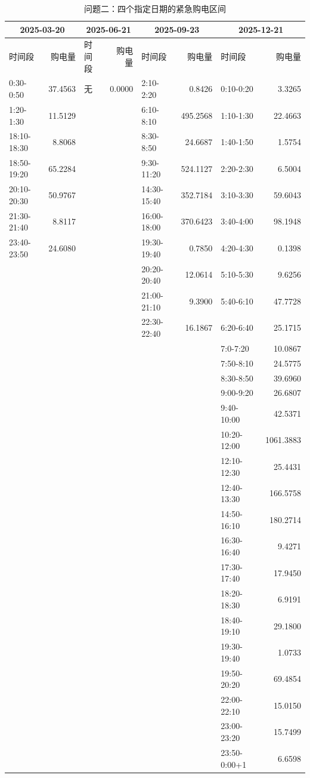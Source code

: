 \begin{table}[H]\centering\caption{问题二：四个指定日期的紧急购电区间}\label{tab:emergency-问题二}\fontsize{9}{11}\selectfont\setlength{\tabcolsep}{2pt}\begin{tabular}{|lr|lr|lr|lr|}\hline
\multicolumn{2}{|c|}{2025-03-20} & \multicolumn{2}{|c|}{2025-06-21} & \multicolumn{2}{|c|}{2025-09-23} & \multicolumn{2}{|c|}{2025-12-21}\\\hline
时间段&购电量&时间段&购电量&时间段&购电量&时间段&购电量\\\hline
0:30-0:50 & 37.4563 & 无 & 0.0000 & 2:10-2:20 & 0.8426 & 0:10-0:20 & 3.3265\\
1:20-1:30 & 11.5129 &  &  & 6:10-8:10 & 495.2568 & 1:10-1:30 & 22.4663\\
18:10-18:30 & 8.8068 &  &  & 8:30-8:50 & 24.6687 & 1:40-1:50 & 1.5754\\
18:50-19:20 & 65.2284 &  &  & 9:30-11:20 & 524.1127 & 2:20-2:30 & 6.5004\\
20:10-20:30 & 50.9767 &  &  & 14:30-15:40 & 352.7184 & 3:10-3:30 & 59.6043\\
21:30-21:40 & 8.8117 &  &  & 16:00-18:00 & 370.6423 & 3:40-4:00 & 98.1948\\
23:40-23:50 & 24.6080 &  &  & 19:30-19:40 & 0.7850 & 4:20-4:30 & 0.1398\\
 &  &  &  & 20:20-20:40 & 12.0614 & 5:10-5:30 & 9.6256\\
 &  &  &  & 21:00-21:10 & 9.3900 & 5:40-6:10 & 47.7728\\
 &  &  &  & 22:30-22:40 & 16.1867 & 6:20-6:40 & 25.1715\\
 &  &  &  &  &  & 7:0-7:20 & 10.0867\\
 &  &  &  &  &  & 7:50-8:10 & 24.5775\\
 &  &  &  &  &  & 8:30-8:50 & 39.6960\\
 &  &  &  &  &  & 9:00-9:20 & 26.6807\\
 &  &  &  &  &  & 9:40-10:00 & 42.5371\\
 &  &  &  &  &  & 10:20-12:00 & 1061.3883\\
 &  &  &  &  &  & 12:10-12:30 & 25.4431\\
 &  &  &  &  &  & 12:40-13:30 & 166.5758\\
 &  &  &  &  &  & 14:50-16:10 & 180.2714\\
 &  &  &  &  &  & 16:30-16:40 & 9.4271\\
 &  &  &  &  &  & 17:30-17:40 & 17.9450\\
 &  &  &  &  &  & 18:20-18:30 & 6.9191\\
 &  &  &  &  &  & 18:40-19:10 & 29.1800\\
 &  &  &  &  &  & 19:30-19:40 & 1.0733\\
 &  &  &  &  &  & 19:50-20:20 & 69.4854\\
 &  &  &  &  &  & 22:00-22:10 & 15.0150\\
 &  &  &  &  &  & 23:00-23:20 & 15.7499\\
 &  &  &  &  &  & 23:50-0:00+1 & 6.6598\\
\hline\end{tabular}\end{table}

